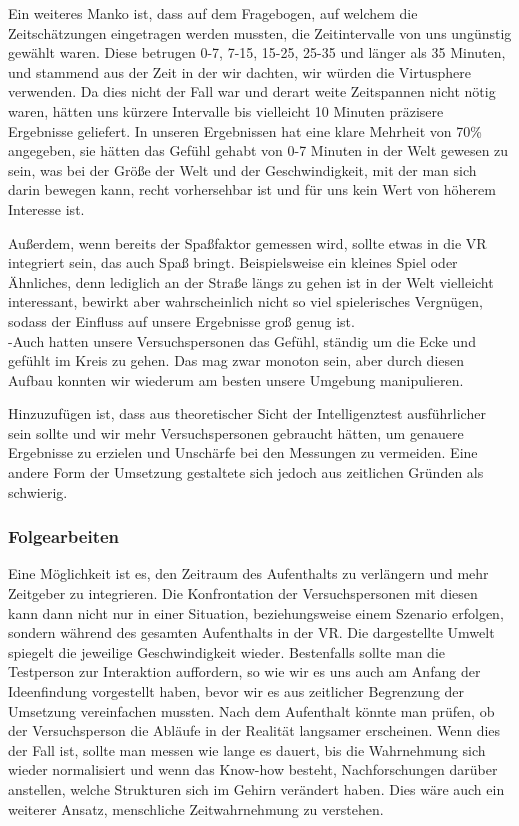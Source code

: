 \documentclass{Bericht}
\begin{document}
Ein weiteres Manko ist, dass auf dem Fragebogen, auf welchem die Zeitschätzungen eingetragen werden mussten,  die Zeitintervalle von uns ungünstig gewählt waren. Diese betrugen 0-7, 7-15, 15-25, 25-35 und länger als 35 Minuten, und stammend aus der Zeit in der wir dachten, wir würden die Virtusphere verwenden. Da dies nicht der Fall war und derart weite Zeitspannen nicht nötig waren, hätten uns kürzere Intervalle bis vielleicht 10 Minuten präzisere Ergebnisse geliefert. In unseren Ergebnissen hat eine klare Mehrheit von 70\% angegeben, sie hätten das Gefühl gehabt von 0-7 Minuten in der Welt gewesen zu sein, was bei der Größe der Welt und der Geschwindigkeit, mit der man sich darin bewegen kann, recht vorhersehbar ist und für uns kein Wert von höherem Interesse ist.

Außerdem, wenn bereits der Spaßfaktor gemessen wird, sollte etwas in die VR integriert sein, das auch Spaß bringt. Beispielsweise ein kleines Spiel oder Ähnliches, denn lediglich an der Straße längs zu gehen ist in der Welt vielleicht interessant, bewirkt aber wahrscheinlich nicht so viel spielerisches Vergnügen, sodass der Einfluss auf unsere Ergebnisse groß  genug ist. \\
 -Auch hatten unsere Versuchspersonen das Gefühl, ständig um die Ecke und gefühlt im Kreis zu gehen. Das mag zwar monoton sein, aber durch diesen Aufbau konnten wir wiederum am besten unsere Umgebung manipulieren.

Hinzuzufügen ist, dass aus theoretischer Sicht der Intelligenztest ausführlicher sein sollte und wir mehr Versuchspersonen gebraucht hätten, um genauere Ergebnisse zu erzielen und Unschärfe bei den Messungen zu vermeiden.
Eine andere Form der Umsetzung gestaltete sich jedoch aus zeitlichen Gründen als schwierig.

\subsubsection{Folgearbeiten}
Eine Möglichkeit ist es, den Zeitraum des Aufenthalts zu verlängern und mehr Zeitgeber zu integrieren. Die Konfrontation der Versuchspersonen mit diesen kann dann nicht nur in einer Situation, beziehungsweise einem Szenario erfolgen, sondern während des gesamten Aufenthalts in der VR. Die dargestellte Umwelt spiegelt die jeweilige Geschwindigkeit wieder. Bestenfalls sollte man die Testperson zur Interaktion auffordern, so wie wir es uns auch am Anfang der Ideenfindung vorgestellt haben, bevor wir es aus zeitlicher Begrenzung der Umsetzung vereinfachen mussten. Nach dem Aufenthalt könnte man prüfen, ob der Versuchsperson die Abläufe in der Realität langsamer erscheinen. Wenn dies der Fall ist, sollte man messen wie lange es dauert, bis die Wahrnehmung sich wieder normalisiert und wenn das Know-how besteht, Nachforschungen darüber anstellen, welche Strukturen sich im Gehirn verändert haben. Dies wäre auch ein weiterer Ansatz, menschliche Zeitwahrnehmung zu verstehen.
\end{document}
